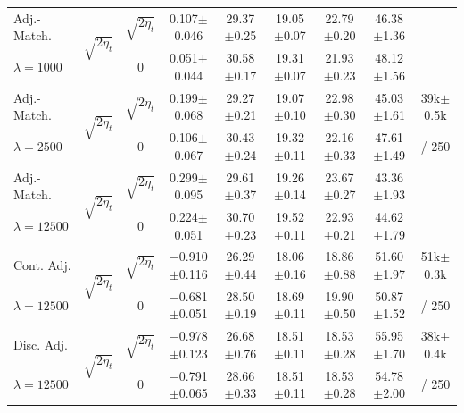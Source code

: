 \begin{table}[h!]
{\begin{tabular}{lcccccccc}
    Adj.-Match.  & \multirow{2}{*}{$\sqrt{2 \eta_t}$} & $\sqrt{2 \eta_t}$ & 0.107{\tiny$\pm$0.046} & 29.37{\tiny$\pm$0.25} & 19.05{\tiny$\pm$0.07} & 22.79{\tiny$\pm$0.20} & 46.38{\tiny$\pm$1.36} &  \\
    $\lambda = 1000$                     &                                    & 0                 & 0.051{\tiny$\pm$0.044} & 30.58{\tiny$\pm$0.17} & 19.31{\tiny$\pm$0.07} & 21.93{\tiny$\pm$0.23} & 48.12{\tiny$\pm$1.56} &  \\
    \addlinespace
    Adj.-Match. & \multirow{2}{*}{$\sqrt{2 \eta_t}$} & $\sqrt{2 \eta_t}$ & 0.199{\tiny$\pm$0.068} & 29.27{\tiny$\pm$0.21} & 19.07{\tiny$\pm$0.10} & 22.98{\tiny$\pm$0.30} & 45.03{\tiny$\pm$1.61} & 39k{\tiny$\pm$0.5k} \\
    $\lambda = 2500$                     &                                    & 0                 & 0.106{\tiny$\pm$0.067} & 30.43{\tiny$\pm$0.24} & 19.32{\tiny$\pm$0.11} & 22.16{\tiny$\pm$0.33} & 47.61{\tiny$\pm$1.49} & / 250 \\
    \addlinespace
    Adj.-Match.  & \multirow{2}{*}{$\sqrt{2 \eta_t}$} & $\sqrt{2 \eta_t}$ & 0.299{\tiny$\pm$0.095} & 29.61{\tiny$\pm$0.37} & 19.26{\tiny$\pm$0.14} & 23.67{\tiny$\pm$0.27} & 43.36{\tiny$\pm$1.93} &  \\
    $\lambda = 12500$                    &                                    & 0                 & 0.224{\tiny$\pm$0.051} & 30.70{\tiny$\pm$0.23} & 19.52{\tiny$\pm$0.11} & 22.93{\tiny$\pm$0.21} & 44.62{\tiny$\pm$1.79} &  \\
    \midrule %
    Cont. Adj. & \multirow{2}{*}{$\sqrt{2 \eta_t}$} & $\sqrt{2 \eta_t}$ & $-$0.910{\tiny$\pm$0.116} & 26.29{\tiny$\pm$0.44} & 18.06{\tiny$\pm$0.16} & 18.86{\tiny$\pm$0.88} & 51.60{\tiny$\pm$1.97} & 51k{\tiny$\pm$0.3k} \\
    $\lambda = 12500$                     &                                    & 0                 & $-$0.681{\tiny$\pm$0.051} & 28.50{\tiny$\pm$0.19} & 18.69{\tiny$\pm$0.11} & 19.90{\tiny$\pm$0.50} & 50.87{\tiny$\pm$1.52} & / 250 \\
    \addlinespace
    Disc. Adj. & \multirow{2}{*}{$\sqrt{2 \eta_t}$} & $\sqrt{2 \eta_t}$ & $-$0.978{\tiny$\pm$0.123} & 26.68{\tiny$\pm$0.76} & 18.51{\tiny$\pm$0.11} & 18.53{\tiny$\pm$0.28} & 55.95{\tiny$\pm$1.70} & 38k{\tiny$\pm$0.4k} \\
    $\lambda = 12500$                    &                                    & 0                 & $-$0.791{\tiny$\pm$0.065} & 28.66{\tiny$\pm$0.33} & 18.51{\tiny$\pm$0.11} & 18.53{\tiny$\pm$0.28} & 54.78{\tiny$\pm$2.00} & / 250 \\

\end{tabular}}
\end{table}
